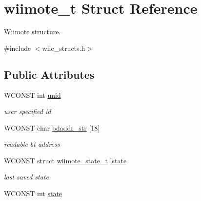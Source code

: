 \hypertarget{structwiimote__t}{\section{wiimote\-\_\-t Struct Reference}
\label{structwiimote__t}
}


Wiimote structure.  




{\ttfamily \#include $<$wiic\-\_\-structs.\-h$>$}

\subsection*{Public Attributes}
\begin{DoxyCompactItemize}
\item 
\hypertarget{structwiimote__t_af8d0abc503b7117566f8f36427ba558e}{W\-C\-O\-N\-S\-T int \hyperlink{structwiimote__t_af8d0abc503b7117566f8f36427ba558e}{unid}}\label{structwiimote__t_af8d0abc503b7117566f8f36427ba558e}

\begin{DoxyCompactList}\small\item\em user specified id \end{DoxyCompactList}\item 
\hypertarget{structwiimote__t_aeaefc436546e371cc5fa15cc866ba802}{W\-C\-O\-N\-S\-T char \hyperlink{structwiimote__t_aeaefc436546e371cc5fa15cc866ba802}{bdaddr\-\_\-str} \mbox{[}18\mbox{]}}\label{structwiimote__t_aeaefc436546e371cc5fa15cc866ba802}

\begin{DoxyCompactList}\small\item\em readable bt address \end{DoxyCompactList}\item 
\hypertarget{structwiimote__t_a1b18fd0743add3b1bdb97f2bb2e41679}{W\-C\-O\-N\-S\-T struct \hyperlink{structwiimote__state__t}{wiimote\-\_\-state\-\_\-t} \hyperlink{structwiimote__t_a1b18fd0743add3b1bdb97f2bb2e41679}{lstate}}\label{structwiimote__t_a1b18fd0743add3b1bdb97f2bb2e41679}

\begin{DoxyCompactList}\small\item\em last saved state \end{DoxyCompactList}\item 
\hypertarget{structwiimote__t_aa8d3f1b4b7c6b5d4de3cb5750f0e509a}{W\-C\-O\-N\-S\-T int \hyperlink{structwiimote__t_aa8d3f1b4b7c6b5d4de3cb5750f0e509a}{state}}\label{structwiimote__t_aa8d3f1b4b7c6b5d4de3cb5750f0e509a}


\end{DoxyCompactItemize}
